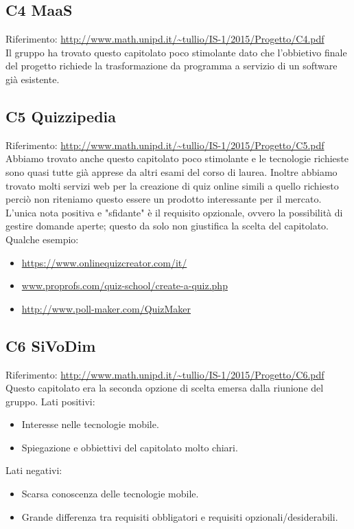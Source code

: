\documentclass{scalatekids-article}
\begin{document}
\subsection{C4 MaaS}
Riferimento: \url{http://www.math.unipd.it/~tullio/IS-1/2015/Progetto/C4.pdf}\\ Il
gruppo ha trovato questo capitolato poco stimolante dato che l'obbietivo finale
del progetto richiede la trasformazione da programma a servizio di un software
già esistente.
\subsection{C5 Quizzipedia}
Riferimento: \url{http://www.math.unipd.it/~tullio/IS-1/2015/Progetto/C5.pdf}\\
Abbiamo trovato anche questo capitolato poco stimolante e le tecnologie
richieste sono quasi tutte già apprese da altri esami del corso di laurea.
Inoltre abbiamo trovato molti servizi web per la creazione di quiz online simili
a quello richiesto perciò non riteniamo questo essere un prodotto interessante
per il mercato. L'unica nota positiva e "sfidante" è il requisito opzionale,
ovvero la possibilità di gestire domande aperte; questo da solo non giustifica
la scelta del capitolato.
Qualche esempio:
\begin{itemize}
\item\url{https://www.onlinequizcreator.com/it/}
\item\url{www.proprofs.com/quiz-school/create-a-quiz.php}
\item\url{http://www.poll-maker.com/QuizMaker}
\end{itemize}
\subsection{C6 SiVoDim}
Riferimento: \url{http://www.math.unipd.it/~tullio/IS-1/2015/Progetto/C6.pdf}\\
Questo capitolato era la seconda opzione di scelta emersa dalla riunione del gruppo.
Lati positivi:
\begin{itemize}
\item Interesse nelle tecnologie mobile.
\item Spiegazione e obbiettivi del capitolato molto chiari.
\end{itemize}
Lati negativi:
\begin{itemize}
\item Scarsa conoscenza delle tecnologie mobile.
\item Grande differenza tra requisiti obbligatori e requisiti opzionali/desiderabili.
\end{itemize}
\end{document}
